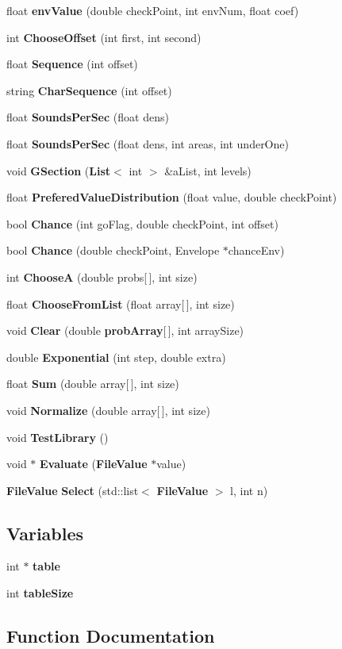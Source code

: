 \begin{CompactItemize}
float {\bf env\-Value} (double check\-Point, int env\-Num, float coef)
\item 
int {\bf Choose\-Offset} (int first, int second)
\item 
float {\bf Sequence} (int offset)
\item 
string {\bf Char\-Sequence} (int offset)
\item 
float {\bf Sounds\-Per\-Sec} (float dens)
\item 
float {\bf Sounds\-Per\-Sec} (float dens, int areas, int under\-One)
\item 
void {\bf GSection} ({\bf List}$<$ int $>$ \&a\-List, int levels)
\item 
float {\bf Prefered\-Value\-Distribution} (float value, double check\-Point)
\item 
bool {\bf Chance} (int go\-Flag, double check\-Point, int offset)
\item 
bool {\bf Chance} (double check\-Point, Envelope $\ast$chance\-Env)
\item 
int {\bf Choose\-A} (double probs[$\,$], int size)
\item 
float {\bf Choose\-From\-List} (float array[$\,$], int size)
\item 
void {\bf Clear} (double {\bf prob\-Array}[$\,$], int array\-Size)
\item 
double {\bf Exponential} (int step, double extra)
\item 
float {\bf Sum} (double array[$\,$], int size)
\item 
void {\bf Normalize} (double array[$\,$], int size)
\item 
void {\bf Test\-Library} ()
\item 
void $\ast$ {\bf Evaluate} ({\bf File\-Value} $\ast$value)
\item 
{\bf File\-Value} {\bf Select} (std::list$<$ {\bf File\-Value} $>$ l, int n)
\end{CompactItemize}
\subsection*{Variables}
\begin{CompactItemize}
\item 
int $\ast$ {\bf table}
\item 
int {\bf table\-Size}
\end{CompactItemize}


\subsection{Function Documentation}
